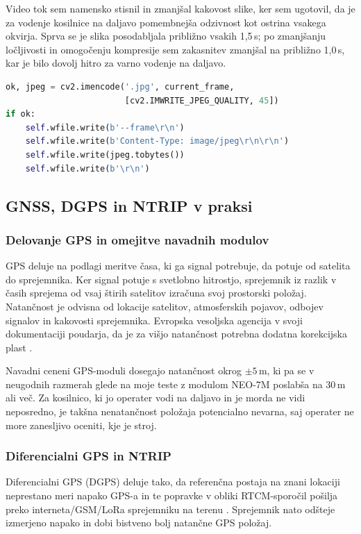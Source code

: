 \documentclass[12pt]{article}
\begin{document}
Video tok sem namensko stisnil in zmanjšal kakovost slike, ker sem
ugotovil, da je za vodenje kosilnice na daljavo pomembnejša odzivnost kot 
ostrina vsakega okvirja. Sprva se je slika posodabljala približno vsakih
1{,}5\,s; po zmanjšanju ločljivosti in omogočenju kompresije sem zakasnitev
zmanjšal na približno 1{,}0\,s, kar je bilo dovolj hitro za varno
vodenje na daljavo.

\begin{lstlisting}[language=Python,
  caption={MJPEG-strežnik z zmerno kakovostjo JPEG.}]
ok, jpeg = cv2.imencode('.jpg', current_frame,
                        [cv2.IMWRITE_JPEG_QUALITY, 45])
if ok:
    self.wfile.write(b'--frame\r\n')
    self.wfile.write(b'Content-Type: image/jpeg\r\n\r\n')
    self.wfile.write(jpeg.tobytes())
    self.wfile.write(b'\r\n')
\end{lstlisting}

\subsection{GNSS, DGPS in NTRIP v praksi}

\subsubsection{Delovanje GPS in omejitve navadnih modulov}

GPS deluje na podlagi meritve časa, ki ga signal potrebuje, da potuje
od satelita do sprejemnika. Ker signal potuje s svetlobno hitrostjo,
sprejemnik iz razlik v časih sprejema od vsaj štirih satelitov
izračuna svoj prostorski položaj. Natančnost je odvisna od lokacije
satelitov, atmosferskih pojavov, odbojev signalov in kakovosti
sprejemnika. Evropska vesoljska agencija v svoji dokumentaciji
poudarja, da je za višjo natančnost potrebna dodatna korekcijska plast
\parencite{esa_satnav}.

Navadni ceneni GPS-moduli dosegajo natančnost okrog $\pm 5$\,m, ki pa
se v neugodnih razmerah glede na moje teste z modulom NEO-7M poslabša na 30\,m ali več. Za
kosilnico, ki jo operater vodi na daljavo in je morda ne vidi
neposredno, je takšna nenatančnost položaja potencialno
nevarna, saj operater ne more zanesljivo oceniti, kje je stroj.

\subsubsection{Diferencialni GPS in NTRIP}

Diferencialni GPS (DGPS) deluje tako, da referenčna postaja na znani
lokaciji neprestano meri napako GPS-a in te popravke v obliki
RTCM-sporočil pošilja preko interneta/GSM/LoRa sprejemniku na terenu \parencite{ntrip_protocol}.
Sprejemnik nato odšteje izmerjeno napako in dobi bistveno bolj
natančne GPS položaj.
\end{document}
